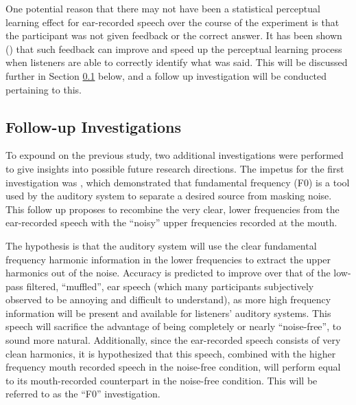 \documentclass[dissertation,copyright]{uathesis}
\begin{document}
One potential reason that there may not have been a statistical perceptual learning effect for ear-recorded speech over the course of the experiment is that the participant was not given feedback or the correct answer.  It has been shown (\cite{davis:05}) that such feedback can improve and speed up the perceptual learning process when listeners are able to correctly identify what was said.  This will be discussed further in Section \ref{ch4:follow-up-expts} below, and a follow up investigation will be conducted pertaining to this.


\subsection{Follow-up Investigations}
\label{ch4:follow-up-expts}

To expound on the previous study, two additional investigations were performed to give insights into possible future research directions.  The impetus for the first investigation was \cite{bird:97}, which demonstrated that fundamental frequency (F0) is a tool used by the auditory system to separate a desired source from masking noise.  This follow up proposes to recombine the very clear, lower frequencies from the ear-recorded speech with the ``noisy'' upper frequencies recorded at the mouth.  

The hypothesis is that the auditory system will use the clear fundamental frequency harmonic information in the lower frequencies to extract the upper harmonics out of the noise.  Accuracy is predicted to improve over that of the low-pass filtered, ``muffled'', ear speech (which many participants subjectively observed to be annoying and difficult to understand), as more high frequency information will be present and available for listeners' auditory systems.  This speech will sacrifice the advantage of being completely or nearly ``noise-free'', to sound more natural.  Additionally, since the ear-recorded speech consists of very clean harmonics, it is hypothesized that this speech, combined with the higher frequency mouth recorded speech in the noise-free condition, will perform equal to its mouth-recorded counterpart in the noise-free condition. This will be referred to as the ``F0'' investigation.
\end{document}

